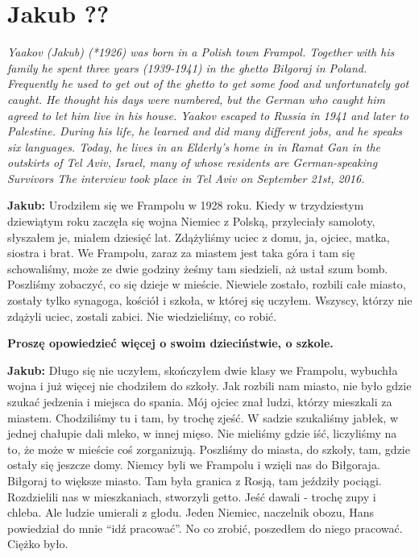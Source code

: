 \section{Jakub ??}

\textit{Yaakov (Jakub) (*1926) was born in a Polish town Frampol. Together with his family he spent three years (1939-1941) in the ghetto Biłgoraj in Poland. Frequently he used to get out of the ghetto to get some food and unfortunately got caught. He thought his days were numbered, but the German who caught him agreed to let him live in his house. Yaakov escaped to Russia in 1941 and later to Palestine. During his life, he learned and did many different jobs, and he speaks six languages. Today, he lives in an Elderly’s home in in Ramat Gan in the outskirts of Tel Aviv, Israel, many of whose residents are German-speaking Survivors The interview took place in Tel Aviv on September 21st, 2016.}\par
\vspace*{2em}
\textbf{Jakub:} Urodziłem się we Frampolu w 1928 roku. Kiedy w trzydziestym dziewiątym roku zaczęła się wojna Niemiec z Polską, przyleciały samoloty, słyszałem je, miałem dziesięć lat. Zdążyliśmy uciec z domu, ja, ojciec, matka, siostra i brat. We Frampolu, zaraz za miastem jest taka góra i tam się schowaliśmy, może ze dwie godziny żeśmy tam siedzieli, aż ustał szum bomb. Poszliśmy zobaczyć, co się dzieje w mieście. Niewiele zostało, rozbili całe miasto, zostały tylko synagoga, kościół i szkoła, w której się uczyłem. Wszyscy, którzy nie zdążyli uciec, zostali zabici. Nie wiedzieliśmy, co robić.  

\textbf{Proszę opowiedzieć więcej o swoim dzieciństwie, o szkole.} 

\textbf{Jakub:} Długo się nie uczyłem, skończyłem dwie klasy we Frampolu, wybuchła wojna i już więcej nie chodziłem do szkoły. Jak rozbili nam miasto, nie było gdzie szukać jedzenia i miejsca do spania. Mój ojciec znał ludzi, którzy mieszkali za miastem. Chodziliśmy tu i tam, by trochę zjeść. W sadzie szukaliśmy jabłek, w jednej chałupie dali mleko, w innej mięso. Nie mieliśmy gdzie iść, liczyliśmy na to, że może w mieście coś zorganizują. Poszliśmy do miasta, do szkoły, tam, gdzie ostały się jeszcze domy. Niemcy byli we Frampolu i wzięli nas do Biłgoraja. Biłgoraj to większe miasto. Tam była granica z Rosją, tam jeździły pociągi. Rozdzielili nas w mieszkaniach, stworzyli getto. Jeść dawali - trochę zupy i chleba. Ale ludzie umierali z głodu. Jeden Niemiec, naczelnik obozu, Hans powiedział do mnie "`idź pracować"'. No co zrobić, poszedłem do niego pracować. Ciężko było.

